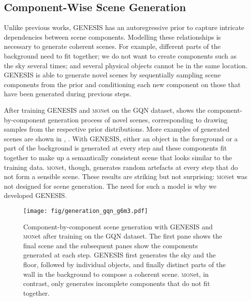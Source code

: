 \documentclass{article}
\begin{document}
\subsection{Component-Wise Scene Generation}

Unlike previous works, \gls{GENESIS} has an autoregressive prior to capture intricate dependencies between scene components.
Modelling these relationships is necessary to generate coherent scenes.
For example, different parts of the background need to fit together; we do not want to create components such as the sky several times; and several physical objects cannot be in the same location.
\gls{GENESIS} is able to generate novel scenes by sequentially sampling scene components from the prior and conditioning each new component on those that have been generated during previous steps.

After training \gls{GENESIS} and \textsc{mon}et on the GQN dataset,  shows the component-by-component generation process of novel scenes, corresponding to drawing samples from the respective prior distributions.
More examples of generated scenes are shown in , .
With \gls{GENESIS}, either an object in the foreground or a part of the background is generated at every step and these components fit together to make up a semantically consistent scene that looks similar to the training data.
\textsc{mon}et, though, generates random artefacts at every step that do not form a sensible scene. 
These results are striking but not surprising: \textsc{mon}et was not designed for scene generation. The need for such a model is why we developed \gls{GENESIS}.

\clearpage

\begin{figure}[h!]
    \centering
    \texttt{[image: fig/generation\_gqn\_g6m3.pdf]}
    \caption{Component-by-component scene generation with \gls{GENESIS} and \textsc{mon}et after training on the GQN dataset. The first pane shows the final scene and the subsequent panes show the components generated at each step. \gls{GENESIS} first generates the sky and the floor, followed by individual objects, and finally distinct parts of the wall in the background to compose a coherent scene. \textsc{mon}et, in contrast, only generates incomplete components that do not fit together.}
    \label{fig:generation_gqn}
\end{figure}
\end{document}
